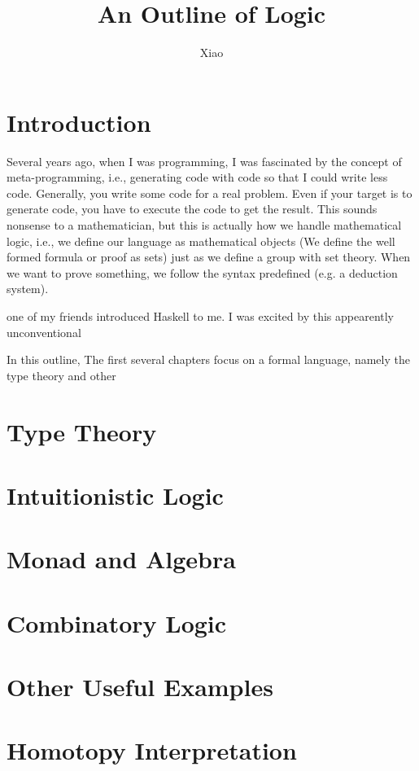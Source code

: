 \documentclass[12pt,a4paper]{report}
\begin{document}
\title{An Outline of Logic}
\author{Xiao}
\date{}
\maketitle

\tableofcontents

\chapter*{Introduction}

Several years ago, when I was programming, I was fascinated
by the concept of meta-programming, i.e., generating code with code
so that I could write less code. Generally, you write some code for
a real problem. Even if your target is to generate code, you have
to execute the code to get the result. This sounds nonsense to a 
mathematician, but this is actually how we handle mathematical 
logic, i.e., we define our language as mathematical objects 
(We define the well formed formula or proof as sets) 
just as we define a group with set theory. When we want to prove
something, we follow the syntax predefined (e.g. a deduction system).

one of my friends introduced Haskell to me.
I was excited by this appearently unconventional

In this outline, The first several chapters focus on a
formal language, namely the type theory and other 

\chapter{Type Theory}
\chapter{Intuitionistic Logic}
\chapter{Monad and Algebra}
\chapter{Combinatory Logic}
\chapter{Other Useful Examples}

\chapter{Homotopy Interpretation}
\end{document}

